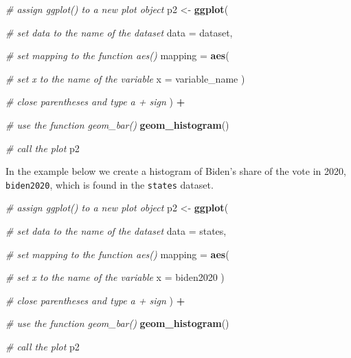 \documentclass[
]{book}
\newenvironment{Shaded}{\begin{snugshade}}{\end{snugshade}}
\newcommand{\AttributeTok}[1]{\textcolor[rgb]{0.13,0.29,0.53}{#1}}
\newcommand{\CommentTok}[1]{\textcolor[rgb]{0.56,0.35,0.01}{\textit{#1}}}
\newcommand{\FunctionTok}[1]{\textcolor[rgb]{0.13,0.29,0.53}{\textbf{#1}}}
\newcommand{\NormalTok}[1]{#1}
\newcommand{\OtherTok}[1]{\textcolor[rgb]{0.56,0.35,0.01}{#1}}
\newcommand{\SpecialCharTok}[1]{\textcolor[rgb]{0.81,0.36,0.00}{\textbf{#1}}}
\begin{document}
\begin{Shaded}
\begin{Highlighting}[]
\CommentTok{\# assign ggplot() to a new plot object}
\NormalTok{p2 }\OtherTok{\textless{}{-}} \FunctionTok{ggplot}\NormalTok{(}
  
  \CommentTok{\# set data to the name of the dataset}
  \AttributeTok{data =}\NormalTok{ dataset,}
  
  \CommentTok{\# set \textasciigrave{}mapping\textasciigrave{} to the function \textasciigrave{}aes()\textasciigrave{}}
  \AttributeTok{mapping =} \FunctionTok{aes}\NormalTok{(}
    
    \CommentTok{\# set \textasciigrave{}x\textasciigrave{} to the name of the variable}
    \AttributeTok{x =}\NormalTok{ variable\_name}
\NormalTok{  )}
  
  \CommentTok{\# close parentheses and type a + sign}
\NormalTok{) }\SpecialCharTok{+}
  
  \CommentTok{\# use the function \textasciigrave{}geom\_bar()\textasciigrave{}}
  \FunctionTok{geom\_histogram}\NormalTok{()}

\CommentTok{\# call the plot}
\NormalTok{p2}
\end{Highlighting}
\end{Shaded}

In the example below we create a histogram of Biden's share of the vote in 2020, \texttt{biden2020}, which is found in the \texttt{states} dataset.

\begin{Shaded}
\begin{Highlighting}[]
\CommentTok{\# assign ggplot() to a new plot object}
\NormalTok{p2 }\OtherTok{\textless{}{-}} \FunctionTok{ggplot}\NormalTok{(}
  
  \CommentTok{\# set data to the name of the dataset}
  \AttributeTok{data =}\NormalTok{ states,}
  
  \CommentTok{\# set \textasciigrave{}mapping\textasciigrave{} to the function \textasciigrave{}aes()\textasciigrave{}}
  \AttributeTok{mapping =} \FunctionTok{aes}\NormalTok{(}
    
    \CommentTok{\# set \textasciigrave{}x\textasciigrave{} to the name of the variable}
    \AttributeTok{x =}\NormalTok{ biden2020}
\NormalTok{  )}
  
  \CommentTok{\# close parentheses and type a + sign}
\NormalTok{) }\SpecialCharTok{+}
  
  \CommentTok{\# use the function \textasciigrave{}geom\_bar()\textasciigrave{}}
  \FunctionTok{geom\_histogram}\NormalTok{()}

\CommentTok{\# call the plot}
\NormalTok{p2}
\end{Highlighting}
\end{Shaded}
\end{document}
